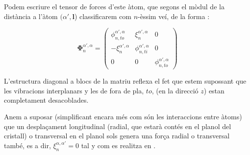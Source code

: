 \documentclass[12pt]{article} %
\let\vec\mathbf %
\begin{document}
{Podem escriure el tensor de forces d'este àtom, que segons el mòdul de la distància a l'àtom $(\alpha',\vec l$) classificarem com $n$-èssim veí, de la forma \cite{wirtz04_phonon_disper_graph_revis}:


\begin{equation}
\vec\Phi_n^{\alpha',\alpha}=\begin{pmatrix}
\phi_{n,to}^{\alpha',\alpha}&\xi_n^{\alpha',\alpha} &0\\
-\xi_n^{\alpha',\alpha} & \phi_{n,ti}^{\alpha',\alpha} & 0 \\
0 & 0 & \phi_{n,to}^{\alpha',\alpha}
\end{pmatrix}
\label{eq:tensordeforces}
\end{equation}

L'estructura diagonal a blocs de la matriu reflexa el fet que estem supossant que  les vibracions interplanars y les de fora de pla, $to$, (en la direcció $z$) estan completament desacoblades.

Anem a suposar (simplificant encara més com són les interaccions entre àtoms) que un despla\c{c}ament longitudinal (radial, que estarà contés en el planol del cristall) o transversal en el planol sols genera una for\c{c}a radial o transversal també, es a dir, $\xi_n^{\alpha,\alpha'}=0$ tal y com es realitza en \cite{Balkanski_2000}. %






}
\end{document}
